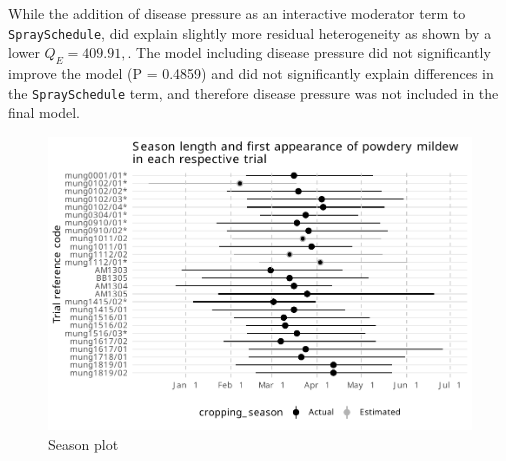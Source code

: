\documentclass[agronomy,article,submit,moreauthors,pdftex]{mdpi}
\begin{document}
While the addition of disease pressure as an interactive moderator term to \texttt{SpraySchedule}, did explain slightly more residual heterogeneity as shown by a lower \(Q_E = 409.91,\).
The model including disease pressure did not significantly improve the model (P = 0.4859) and did not significantly explain differences in the \texttt{SpraySchedule} term, and therefore disease pressure was not included in the final model.

\begin{figure}
\centering
\includegraphics{paper_files/figure-latex/Figure2-1.pdf}
\caption{\label{fig:Figure2}Season plot}
\end{figure}
\end{document}
